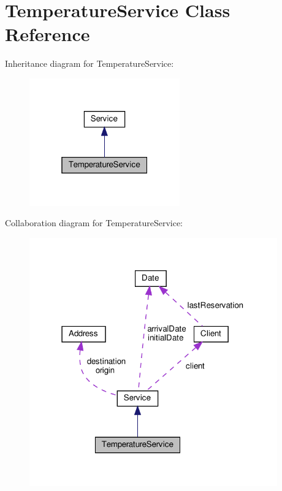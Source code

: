 \hypertarget{class_temperature_service}{}\section{Temperature\+Service Class Reference}
\label{class_temperature_service}


Inheritance diagram for Temperature\+Service\+:\nopagebreak
\begin{figure}[H]
\begin{center}
\leavevmode
\includegraphics[width=184pt]{class_temperature_service__inherit__graph}
\end{center}
\end{figure}


Collaboration diagram for Temperature\+Service\+:\nopagebreak
\begin{figure}[H]
\begin{center}
\leavevmode
\includegraphics[width=303pt]{class_temperature_service__coll__graph}
\end{center}
\end{figure}
